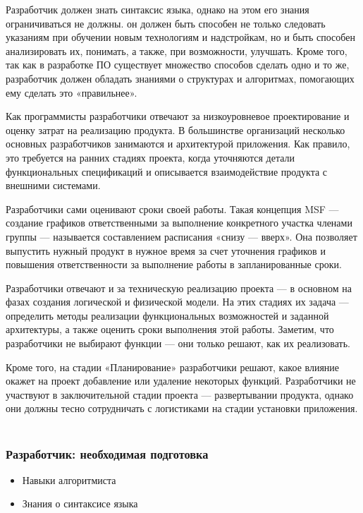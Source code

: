 \documentclass{../industrial-development}
\begin{document}
\lecturenotes

Разработчик должен знать синтаксис языка, однако на этом его знания ограничиваться не должны. он должен быть способен не только следовать указаниям при обучении новым технологиям и надстройкам, но и быть способен анализировать их, понимать, а также, при возможности, улучшать. Кроме того, так как в разработке ПО существует множество способов сделать одно и то же, разработчик должен обладать знаниями о структурах и алгоритмах, помогающих ему сделать это «правильнее».   ~\cite{Anatomy}

Как программисты разработчики отвечают за низкоуровневое проектирование и оценку затрат на реализацию продукта. В большинстве организаций несколько основных разработчиков занимаются и архитектурой приложения. Как правило, это требуется на ранних ста­диях проекта, когда уточняются детали функциональных спецификаций и описывается взаимодействие продукта с внешними системами.

Разработчики сами оценивают сроки своей работы. Такая концепция MSF — создание графиков ответственными за выполнение конкретного участка членами группы — называется составлением расписания «снизу — вверх». Она позволяет выпустить нужный продукт в нужное время за счет уточнения графиков и повышения ответственности за выполнение работы в запланированные сроки.

Разработчики отвечают и за техническую реализацию проекта — в основном на фазах создания логической и физической модели. На этих стадиях их задача — определить методы реализации функциональных возможностей и заданной архитектуры, а также оценить сроки выполнения этой работы. Заметим, что разработчики не выбирают функции — они только решают, как их реализовать.

Кроме того, на стадии «Планирование» разработчики решают, какое влияние окажет на проект добавление или удаление некоторых функций. Разработчики не участвуют в заключительной стадии проекта — развертывании продукта, однако они должны тесно сотрудничать с логистиками на стадии установки приложения. ~\cite{Collective}
\begin{frame} \frametitle{Разработчик: необходимая подготовка}
  \begin{itemize}
  \item Навыки алгоритмиста 
  \item Знания о синтаксисе языка
  \end{itemize}
\end{frame}

\lecturenotes
\end{document}
